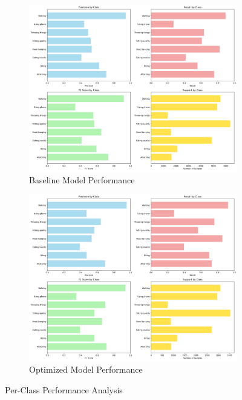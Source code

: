 \documentclass{iopconfser}
\begin{document}
\begin{figure}[H]
\centering
\begin{subfigure}{0.48\textwidth}
    \centering
    \includegraphics[width=\textwidth]{results/metrics/baseline/class_performance.png}
    \caption{Baseline Model Performance}
    \label{fig:baseline_class}
\end{subfigure}
\hfill
\begin{subfigure}{0.48\textwidth}
    \centering
    \includegraphics[width=\textwidth]{results/metrics/optimized/class_performance.png}
    \caption{Optimized Model Performance}
    \label{fig:optimized_class}
\end{subfigure}
\caption{Per-Class Performance Analysis}
\label{fig:class_performance}
\end{figure}
\end{document}
